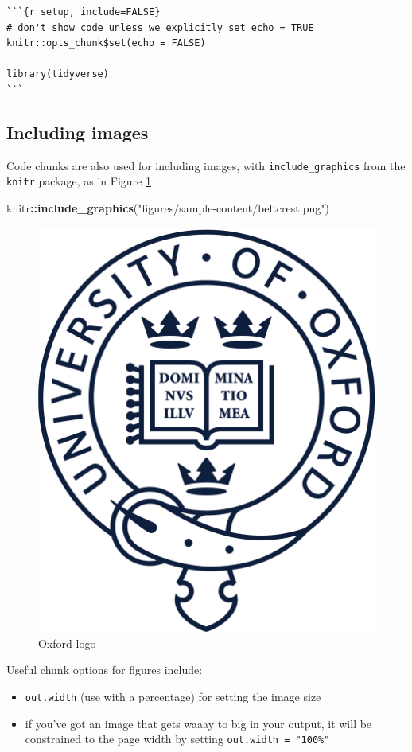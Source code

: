 \documentclass[a4paper,nobind]{templates/ociamthesis}
\providecommand{\tightlist}{%
  \setlength{\itemsep}{0pt}\setlength{\parskip}{0pt}}
\newenvironment{Shaded}{\begin{snugshade}}{\end{snugshade}}
\newcommand{\KeywordTok}[1]{\textcolor[rgb]{0.13,0.29,0.53}{\textbf{#1}}}
\newcommand{\NormalTok}[1]{#1}
\newcommand{\OperatorTok}[1]{\textcolor[rgb]{0.81,0.36,0.00}{\textbf{#1}}}
\newcommand{\StringTok}[1]{\textcolor[rgb]{0.31,0.60,0.02}{#1}}
\renewenvironment{Shaded}
{
  \vspace{10pt}%
  \begin{snugshade}%
}{%
  \end{snugshade}%
  \vspace{8pt}%
}
\begin{document}
\begin{verbatim}
```{r setup, include=FALSE}
# don't show code unless we explicitly set echo = TRUE
knitr::opts_chunk$set(echo = FALSE)

library(tidyverse)
```
\end{verbatim}

\subsection{Including images}\label{including-images}

Code chunks are also used for including images, with
\texttt{include\_graphics} from the \texttt{knitr} package, as in Figure
\ref{fig:oxford-logo}

\begin{Shaded}
\begin{Highlighting}[]
\NormalTok{knitr}\OperatorTok{::}\KeywordTok{include_graphics}\NormalTok{(}\StringTok{"figures/sample-content/beltcrest.png"}\NormalTok{)}
\end{Highlighting}
\end{Shaded}

\begin{figure}

{\centering \includegraphics[width=0.5\linewidth]{figures/sample-content/beltcrest} 

}

\caption{Oxford logo}\label{fig:oxford-logo}
\end{figure}

Useful chunk options for figures include:

\begin{itemize}
\tightlist
\item
  \texttt{out.width} (use with a percentage) for setting the image size
\item
  if you've got an image that gets waaay to big in your output, it will
  be constrained to the page width by setting
  \texttt{out.width\ =\ "100\%"}
\end{itemize}
\end{document}
